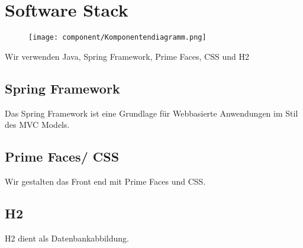 \newpage
\section{Software Stack}

\begin{figure}
\texttt{[image: component/Komponentendiagramm.png]}
\end{figure}
\newpage
Wir verwenden Java, Spring Framework, Prime Faces, CSS und H2

\subsection{Spring Framework}
Das Spring Framework ist eine Grundlage für Webbasierte Anwendungen im Stil des MVC Models.

\subsection{Prime Faces/ CSS}
Wir gestalten das Front end mit Prime Faces und CSS.

\subsection{H2}
H2 dient als Datenbankabbildung.
